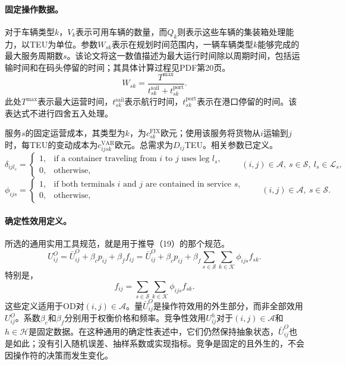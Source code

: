 \documentclass{article}
\begin{document}
\paragraph{固定操作数据。}
对于车辆类型\(k\)，\(V_k\)表示可用车辆的数量，而\(Q_k\)则表示这些车辆的集装箱处理能力，以TEU为单位。参数\(W_{sk}\)表示在规划时间范围内，一辆车辆类型\(k\)能够完成的最大服务周期数\(s\)。该论文将这一数值描述为最大运行时间除以周期时间，包括运输时间和在码头停留的时间；其具体计算过程见PDF第20页。
\[
W_{sk}=\frac{T^{\max}}{t_{sk}^{\mathrm{sail}}+t_{sk}^{\mathrm{port}}}.
\]
此处\(T^{\max}\)表示最大运营时间，\(t_{sk}^{\mathrm{sail}}\)表示航行时间，\(t_{sk}^{\mathrm{port}}\)表示在港口停留的时间。该表达式不进行四舍五入处理。

服务\(s\)的固定运营成本，其类型为\(k\)，为\(c_{sk}^{\mathrm{FIX}}\)欧元；使用该服务将货物从\(i\)运输到\(j\)时，每TEU的变动成本为\(c_{ijsk}^{\mathrm{VAR}}\)欧元。总需求为\(D_{ij}\)TEU。相关参数已定义。
\[
\delta_{ijl_s}=\begin{cases}
1,&\text{if a container traveling from }i\text{ to }j\text{ uses leg }l_s,\\
0,&\text{otherwise},
\end{cases}
\qquad (i,j)\in\mathcal A,\ s\in\mathcal S,\ l_s\in\mathcal L_s,
\]
\[
\phi_{ijs}=\begin{cases}
1,&\text{if both terminals }i\text{ and }j\text{ are contained in service }s,\\
0,&\text{otherwise},
\end{cases}
\qquad (i,j)\in\mathcal A,\ s\in\mathcal S.
\]

\paragraph{确定性效用定义。}
所选的通用实用工具规范，就是用于推导（19）的那个规范。
\begin{equation}
U_{ij}^{O}=\bar U_{ij}^{O}+\beta_c p_{ij}+\beta_f f_{ij}
=\bar U_{ij}^{O}+\beta_c p_{ij}
+\beta_f\sum_{s\in\mathcal S}\sum_{k\in\mathcal K}\phi_{ijs}f_{sk}.
\tag{17}
\end{equation}
特别是，
\[
f_{ij}=\sum_{s\in\mathcal S}\sum_{k\in\mathcal K}\phi_{ijs}f_{sk}.
\]
这些定义适用于OD对\((i,j)\in\mathcal A\)。量\(\bar U_{ij}^{O}\)是操作符效用的外生部分，而非全部效用\(U_{ij}^{O}\)。系数\(\beta_c\)和\(\beta_f\)分别用于权衡价格和频率。竞争性效用\(U_{ij}^{h}\)对于\((i,j)\in\mathcal A\)和\(h\in\mathcal H\)是固定数据。在这种通用的确定性表述中，它们仍然保持抽象状态，\(\bar U_{ij}^{O}\)也是如此；没有引入随机误差、抽样系数或实现指标。竞争是固定的且外生的，不会因操作符的决策而发生变化。
\end{document}
